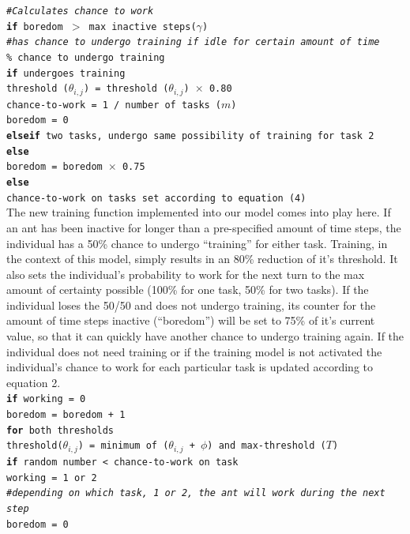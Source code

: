 \documentclass[a4paper]{article}
\begin{document}
\texttt{\textit{\#Calculates chance to work}\\
\indent \textbf{if} boredom $>$ max inactive steps($\gamma$)\\
\indent \textit{\#has chance to undergo training if idle for certain amount of time}\\
\indent {}\% chance to undergo training \\
\indent \indent \textbf{if} undergoes training\\
\indent \indent \indent threshold ($\theta_{i,j}$) = threshold ($\theta_{i,j}$) $\times$ 0.80 \\
\indent \indent \indent chance-to-work = 1 / number of tasks ($m$)\\
\indent \indent \indent boredom = 0 \\
\indent \indent \textbf{elseif} two tasks, undergo same possibility of training for task 2\\
\indent \indent \textbf{else}\\
\indent \indent \indent boredom = boredom $\times$ 0.75\\ 
\indent \indent \textbf{else}\\
\indent \indent \indent chance-to-work on tasks set according to equation (4)}\\

The new training function implemented into our model comes into play here. If an ant has been inactive for longer than a pre-specified amount of time steps, the individual has a 50\% chance to undergo “training” for either task. Training, in the context of this model, simply results in an 80\% reduction of it’s threshold. It also sets the individual’s probability to work for the next turn to the max amount of certainty possible (100\% for one task, 50\% for two tasks). If the individual loses the 50/50 and does not undergo training, its counter for the amount of time steps inactive (“boredom”) will be set to 75\% of it’s current value, so that it can quickly have another chance to undergo training again. If the individual does not need training or if the training model is not activated the individual’s chance to work for each particular task is updated according to equation 2.\\

\texttt{\textbf{if} working = 0\\
\indent \indent boredom = boredom + 1\\
\indent \indent \textbf{for} both thresholds\\
\indent \indent \indent threshold($\theta_{i,j}$) = minimum of  ($\theta_{i,j}$ + $\phi$) and max-threshold ($T$)\\
\indent \indent \textbf{if} random number < chance-to-work on task\\
\indent \indent \indent working =  1 or 2\\
\indent \indent \indent \textit{\#depending on which task, 1 or 2, the ant will work during the next step}\\
\indent \indent \indent boredom = 0}\\
\end{document}
